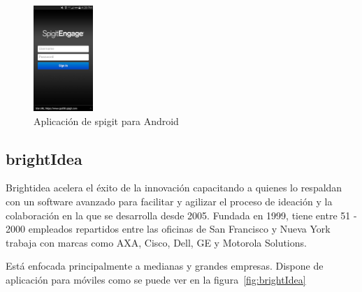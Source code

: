 \begin{figure}[!h]
\begin{center}
		\includegraphics[width=0.2\textwidth]{./img/competencia/spigit/6.png}
		\caption{Aplicación de spigit para Android}
		\label{fig:sipigi}
	\end{center}
\end{figure}

\subsection{brightIdea}

Brightidea acelera el éxito de la innovación capacitando a quienes lo respaldan con un software avanzado para facilitar  y agilizar el proceso de ideación y la colaboración en la que se desarrolla desde 2005. Fundada en 1999, tiene entre 51 - 2000 empleados 
repartidos entre las oficinas de San Francisco y Nueva York trabaja con marcas como AXA, Cisco, Dell, GE y Motorola Solutions.

Está enfocada principalmente a medianas y grandes empresas. Dispone de aplicación para móviles como se puede ver en la figura~\ref{fig:brightIdea}

